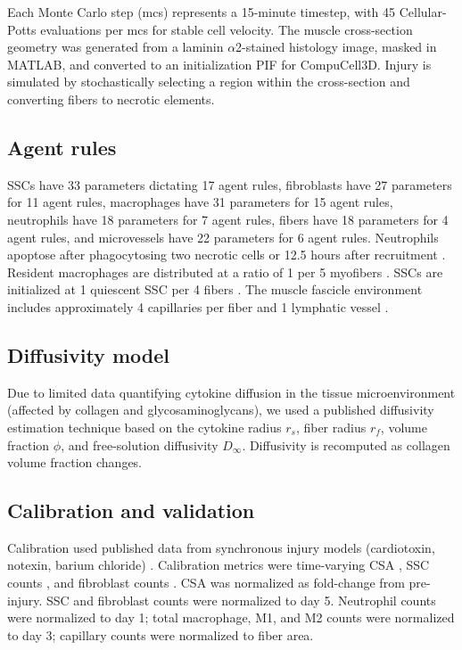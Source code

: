 \documentclass[11pt]{article}
\begin{document}
Each Monte Carlo step (mcs) represents a 15-minute timestep, with 45 Cellular-Potts evaluations per mcs for stable cell velocity. The muscle cross-section geometry was generated from a laminin $\alpha$2-stained histology image, masked in MATLAB, and converted to an initialization PIF for CompuCell3D. Injury is simulated by stochastically selecting a region within the cross-section and converting fibers to necrotic elements.

\subsection{Agent rules}
SSCs have 33 parameters dictating 17 agent rules, fibroblasts have 27 parameters for 11 agent rules, macrophages have 31 parameters for 15 agent rules, neutrophils have 18 parameters for 7 agent rules, fibers have 18 parameters for 4 agent rules, and microvessels have 22 parameters for 6 agent rules. Neutrophils apoptose after phagocytosing two necrotic cells or 12.5 hours after recruitment \citep{r33}. Resident macrophages are distributed at a ratio of 1 per 5 myofibers \citep{r34}. SSCs are initialized at 1 quiescent SSC per 4 fibers \citep{r57}. The muscle fascicle environment includes approximately 4 capillaries per fiber and 1 lymphatic vessel \citep{r93,r94}.

\subsection{Diffusivity model}
Due to limited data quantifying cytokine diffusion in the tissue microenvironment (affected by collagen and glycosaminoglycans), we used a published diffusivity estimation technique \citep{r101} based on the cytokine radius $r_s$, fiber radius $r_f$, volume fraction $\phi$, and free-solution diffusivity $D_\infty$. Diffusivity is recomputed as collagen volume fraction changes.

\subsection{Calibration and validation}
Calibration used published data from synchronous injury models (cardiotoxin, notexin, barium chloride) \citep{r97}. Calibration metrics were time-varying CSA \citep{r102}, SSC counts \citep{r76}, and fibroblast counts \citep{r76}. CSA was normalized as fold-change from pre-injury. SSC and fibroblast counts were normalized to day 5. Neutrophil counts were normalized to day 1; total macrophage, M1, and M2 counts were normalized to day 3; capillary counts were normalized to fiber area.
\end{document}
